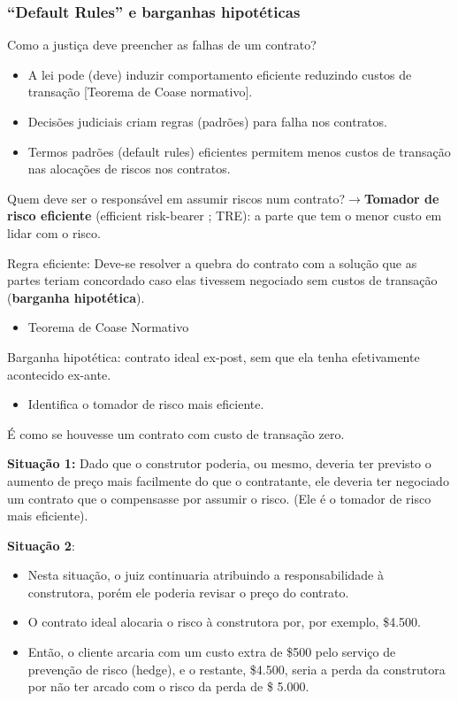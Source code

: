 \documentclass[a4paper,12pt]{article}[abntex2]
\begin{document}
\subsubsection{\textbf{“Default Rules” e barganhas hipotéticas}}
Como a justiça deve preencher as falhas de um contrato?\begin{itemize}
    \item A lei pode (deve) induzir comportamento eficiente reduzindo custos de transação [Teorema de Coase normativo].
    \item Decisões judiciais criam regras (padrões) para falha nos contratos.
    \item Termos padrões (default rules) eficientes permitem menos custos de transação nas alocações de riscos nos contratos.
\end{itemize}

Quem deve ser o responsável em assumir riscos num contrato?\(\rightarrow\)\textbf{Tomador de risco eficiente} (efficient risk-bearer ; TRE): a parte que tem o menor custo em lidar com o risco.

Regra eficiente: Deve-se resolver a quebra do contrato com a solução que as partes teriam concordado caso elas tivessem negociado sem custos de transação (\textbf{barganha hipotética}).\begin{itemize} 
    \item Teorema de Coase Normativo
\end{itemize}

Barganha hipotética: contrato ideal ex-post, sem que ela tenha efetivamente acontecido ex-ante. \begin{itemize}
    \item Identifica o tomador de risco mais eficiente.
\end{itemize}

É como se houvesse um contrato com custo de transação zero.

\textbf{Situação 1:} Dado que o construtor poderia, ou mesmo, deveria ter previsto o aumento de preço mais facilmente do que o contratante, ele deveria ter negociado um contrato que o compensasse por assumir o risco. (Ele é o tomador de risco mais eficiente).

\textbf{Situação 2}:\begin{itemize}
    \item Nesta situação, o juiz continuaria atribuindo a responsabilidade à construtora, porém ele poderia revisar o preço do contrato.
    \item O contrato ideal alocaria o risco à construtora  por, por exemplo, \$4.500. 
    \item Então, o cliente arcaria com um custo extra de \$500 pelo serviço de prevenção de risco (hedge), e o restante, \$4.500, seria a perda da construtora por não ter arcado com o risco da perda de \$ 5.000.
\end{itemize}
\end{document}

